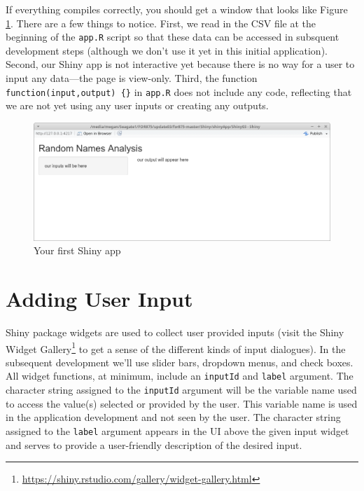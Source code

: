 \documentclass[
]{krantz}
\renewcommand{\href}[2]{#2\footnote{\url{#1}}}
\begin{document}
If everything compiles correctly, you should get a window that looks like Figure \ref{fig:fig2}. There are a few things to notice. First, we read in the CSV file at the beginning of the \texttt{app.R} script so that these data can be accessed in subsquent development steps (although we don't use it yet in this initial application). Second, our Shiny app is not interactive yet because there is no way for a user to input any data---the page is view-only. Third, the function \texttt{function(input,output)\ \{\}} in \texttt{app.R} does not include any code, reflecting that we are not yet using any user inputs or creating any outputs.

\begin{figure}
\includegraphics[width=1\linewidth]{../figures/appSimple} \caption{Your first Shiny app}\label{fig:fig2}
\end{figure}

\hypertarget{adding-user-input}{%
\section{Adding User Input}\label{adding-user-input}}

Shiny package widgets are used to collect user provided inputs (visit the \href{https://shiny.rstudio.com/gallery/widget-gallery.html}{Shiny Widget Gallery} to get a sense of the different kinds of input dialogues). In the subsequent development we'll use slider bars, dropdown menus, and check boxes. All widget functions, at minimum, include an \texttt{inputId} and \texttt{label} argument. The character string assigned to the \texttt{inputId} argument will be the variable name used to access the value(s) selected or provided by the user. This variable name is used in the application development and not seen by the user. The character string assigned to the \texttt{label} argument appears in the UI above the given input widget and serves to provide a user-friendly description of the desired input.
\end{document}
